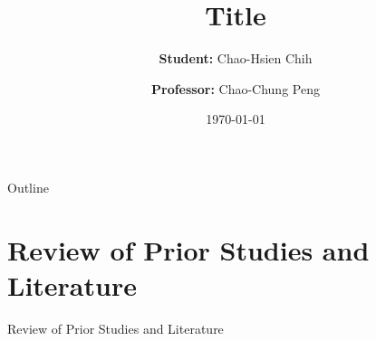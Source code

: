 \documentclass[10pt,xcolor={x11names}]{beamer}
\title[Short Title]{Title}
\author[P46104269@gs.ncku.edu.tw]{\textbf{Student:} Chao-Hsien Chih \and \textbf{Professor:} Chao-Chung Peng }
\institute[NCKU-IAA IEC-Lab] %
{

    \begin{tabular}{cc}
        \begin{minipage}{0.15\linewidth}
            \begin{figure}
                \texttt{[image: IEC\_Lab\_Logo.png]}
            \end{figure}
        \end{minipage}
        &
        \begin{minipage}{0.6\linewidth}
            Intelligent Embedded Control Lab (IEC-Lab) \\
            Department of Aeronautics and Astronautics \\
            National Cheng Kung University \\
            Tainan, Taiwan 
        \end{minipage}
    \end{tabular}
}
\date{\today}
\begin{document}
\begin{frame}
    \maketitle
\end{frame}

\begin{frame}{Outline}
    \tableofcontents
\end{frame}

\section{Review of Prior Studies and Literature}

\begin{frame}{Review of Prior Studies and Literature}
\end{frame}
\end{document}
